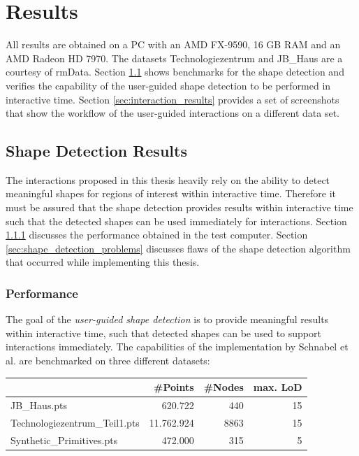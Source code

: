\chapter{Results}
\label{chap:results}

All results are obtained on a PC with an AMD FX-9590, 16 GB RAM and an AMD Radeon HD 7970. The datasets Technologiezentrum and JB\_Haus are a courtesy of rmData\cite{rmdata}. Section \ref{sec:shape_detection_results} shows benchmarks for the shape detection and verifies the capability of the user-guided shape detection to be performed in interactive time. Section \ref{sec:interaction_results} provides a set of screenshots that show the workflow of the user-guided interactions on a different data set. 


\section{Shape Detection Results}
\label{sec:shape_detection_results}

The interactions proposed in this thesis heavily rely on the ability to detect meaningful shapes for regions of interest within interactive time. Therefore it must be assured that the shape detection provides results within interactive time such that the detected shapes can be used immediately for interactions. Section \ref{sec:shape_detection_performance} discusses the performance obtained in the test computer. Section \ref{sec:shape_detection_problems} discusses flaws of the shape detection algorithm that occurred while implementing this thesis.


\subsection{Performance}

\label{sec:shape_detection_performance}

The goal of the \textit{user-guided shape detection} is to provide meaningful results within interactive time, such that detected shapes can be used to support interactions immediately. The capabilities of the implementation by Schnabel et al. \cite{schnabel-2007-software} are benchmarked on three different datasets: 

\begin{center}
\begin{tabular}{ l | r | r | r }
																	& \textbf{\#Points}	& \textbf{\#Nodes}	& \textbf{max. LoD} \\
    \hline
  JB\_Haus.pts                    & 620.722           & 440             	& 15 \\
  Technologiezentrum\_Teil1.pts   & 11.762.924        & 8863             	& 15 \\
  Synthetic\_Primitives.pts     	& 472.000           & 315               & 5 \\
    
\end{tabular}
\end{center}

